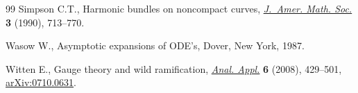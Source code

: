 \documentclass[11pt]{article}
\numberwithin{equation}{section}
\numberwithin{equation}{section}
\begin{document}
\begin{thebibliography}{99}
Simpson C.T., Harmonic bundles on noncompact curves, \href{https://doi.org/10.2307/1990935}{\textit{J.~Amer. Math.
 Soc.}} \textbf{3} (1990), 713--770.

Wasow W., Asymptotic expansions of {ODE}'s, Dover, New York, 1987.

Witten E., Gauge theory and wild ramification, \href{https://doi.org/10.1142/S0219530508001195}{\textit{Anal. Appl.}} \textbf{6}
 (2008), 429--501, \href{https://arxiv.org/abs/0710.0631}{arXiv:0710.0631}.

\end{thebibliography}
\end{document}

